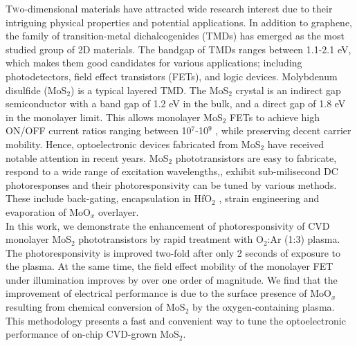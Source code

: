 \documentclass[%
 reprint,
superscriptaddress,
 amsmath,amssymb,
 aps,
prb,
]{revtex4-1}
\begin{document}


\lettrine[lines=2]{T}wo-dimensional materials have attracted wide research interest due to their intriguing physical properties and potential applications. In addition to graphene, the family of transition-metal dichalcogenides (TMDs) has emerged as the most studied group of 2D materials. The bandgap of TMDs ranges between 1.1-2.1 eV, \cite{wang2012electronics} which makes them good candidates for various applications; including photodetectors, \cite{Li2015, Miao2015, Qiu2014} field effect transistors (FETs), \cite{Radisavljevic2013} and logic devices.\cite{huang2013large} Molybdenum disulfide (MoS$_2$) is a typical layered TMD. The MoS$_2$ crystal is an indirect gap semiconductor with a band gap of 1.2 eV in the bulk, and a direct gap of 1.8 eV in the monolayer limit.\cite{Mak2010a} This allows monolayer MoS$_2$ FETs to achieve high ON/OFF current ratios ranging between 10$^7$-10$^9$ \cite{qiu2012electrical}, while preserving decent carrier mobility. 
Hence, optoelectronic devices fabricated from MoS$_2$ have received notable attention in recent years. \cite{LopezSanchez2013, Chen2015, qin2016atomic} MoS$_2$ phototransistors are easy to fabricate, respond to a wide range of excitation wavelengths,\cite{LopezSanchez2013, Wang2015}, exhibit sub-milisecond DC photoresponses \cite{yore2017large} and their photoresponsivity can be tuned by various methods. These include back-gating,\cite{Yin2012} encapsulation in HfO$_2$ \cite{Kufer2015}, strain engineering \cite{wang2017thermally} and evaporation of MoO$_x$ overlayer.\cite{Yoo2017}\\
\indent In this work, we demonstrate the enhancement of photoresponsivity of CVD monolayer MoS$_2$ phototransistors by rapid treatment with O$_2$:Ar (1:3) plasma. The photoresponsivity is improved two-fold after only 2 seconds of exposure to the plasma. At the same time, the field effect mobility of the monolayer FET under illumination improves by over one order of magnitude. We find that the improvement of electrical performance is due to the surface presence of MoO$_x$ resulting from chemical conversion of MoS$_2$ by the oxygen-containing plasma. This methodology presents a fast and convenient way to tune the optoelectronic performance of on-chip CVD-grown MoS$_2$. \newline
\end{document}
